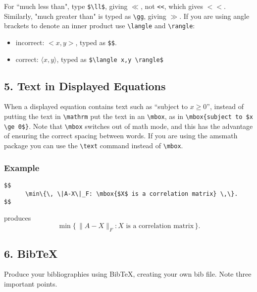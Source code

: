 \documentclass[12pt]{extarticle}
\begin{document}
For ``much less than", type \verb"$\ll$", giving $\ll$, 
not \verb"<<", which gives $<<$.
Similarly, "much greater than" is typed as \texttt{\textbackslash{}gg}, giving $\gg$.
If you are using angle brackets to denote an inner product
use \texttt{\textbackslash{}langle} and \texttt{\textbackslash{}rangle}:

\begin{itemize}
\item incorrect: $<x,y>$, typed as  \texttt{\$<x,y>\$}.
\item correct: $\langle x,y \rangle$, typed as \texttt{\$\textbackslash{}langle x,y \textbackslash{}rangle\$}
\end{itemize}

\subsection*{5. Text in Displayed Equations}
\label{sec-1-5}
When a displayed equation contains text such as 
``subject to $x \ge 0$'',
instead of putting the text in \texttt{\textbackslash{}mathrm} put the text in an
\texttt{\textbackslash{}mbox}, as in 
\texttt{\textbackslash{}mbox\{subject to \$x \textbackslash{}ge 0\$\}}.
Note that \texttt{\textbackslash{}mbox} switches out of math mode,
and this has the advantage of ensuring the correct spacing between words.
If you are using the amsmath package you can use the \texttt{\textbackslash{}text} command
instead of \texttt{\textbackslash{}mbox}.
\subsubsection*{Example}
\label{sec-1-5-1}
\begin{verbatim}
$$
      \min\{\, \|A-X\|_F: \mbox{$X$ is a correlation matrix} \,\}.
$$
\end{verbatim}
produces
$$
   \min\{\, \|A-X\|_F: \mbox{$X$ is a correlation matrix} \,\}.
$$
\subsection*{6. BibTeX}
\label{sec-1-6}
Produce your bibliographies using BibTeX, creating your own bib file.
Note three important points.
\end{document}
